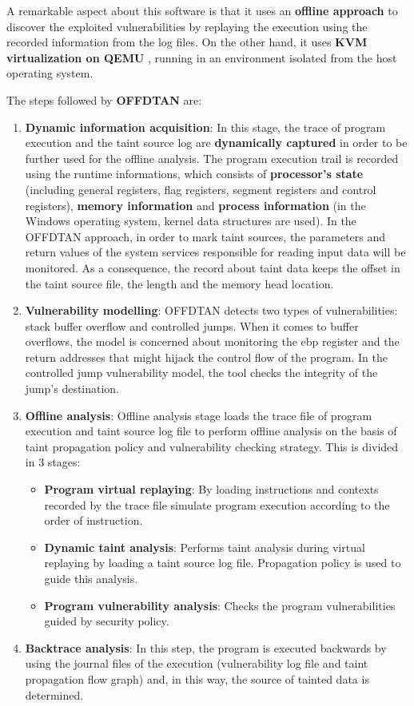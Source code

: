 \documentclass[10pt,a4paper,english,onecolumn]{IEEEtran}
\begin{document}
A remarkable aspect about this software is that it uses an \textbf{offline approach} to discover the exploited vulnerabilities by replaying the execution using the recorded information from the log files. On the other hand, it uses \textbf{KVM virtualization on QEMU} , running in an environment isolated from the host operating system.

The steps followed by \textbf{OFFDTAN} are:

\begin{enumerate}
    \item \textbf{Dynamic information acquisition}: In this stage, the trace of program execution and the taint source log are \textbf{dynamically captured} in order to be further used for the offline analysis. The program execution trail is recorded using the runtime informations, which consists of \textbf{processor's state} (including general registers, flag registers, segment registers and control registers), \textbf{memory information} and \textbf{process information} (in the Windows operating system, kernel data structures are used). In the OFFDTAN approach, in order to mark taint sources, the parameters and return values of the system services responsible for reading input data will be monitored. As a consequence, the record about taint data keeps the offset in the taint source file, the length and the memory head location.
    \item \textbf{Vulnerability modelling}: OFFDTAN detects two types of vulnerabilities: stack buffer overflow and controlled jumps. When it comes to buffer overflows, the model is concerned about monitoring the ebp register and the return addresses that might hijack the control flow of the program. In the controlled jump vulnerability model, the tool checks the integrity of the jump's destination.
    \item \textbf{Offline analysis}: Offline analysis stage loads the trace file of program execution and taint source log file to perform offline analysis on the basis of taint propagation policy and vulnerability checking strategy. This is divided in 3 stages:
        \begin{itemize}
            \item \textbf{Program virtual replaying}: By loading instructions and contexts recorded by the trace file simulate program execution according to the order of instruction.
            \item \textbf{Dynamic taint analysis}: Performs taint analysis during virtual replaying by loading a taint source log file. Propagation policy is used to guide this analysis.
            \item \textbf{Program vulnerability analysis}: Checks the program vulnerabilities guided by security policy.
        \end{itemize}
    \item \textbf{Backtrace analysis}: In this step, the program is executed backwards by using the journal files of the execution (vulnerability log file and taint propagation flow graph) and, in this way, the source of tainted data is determined.
\end{enumerate}
\end{document}
